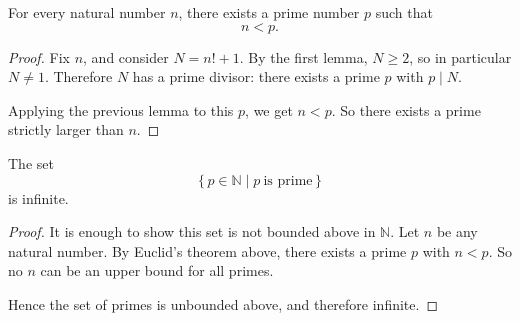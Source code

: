 \begin{theorem}
For every natural number $n$, there exists a prime number $p$ such that
\[
n<p.
\]
\end{theorem}

\begin{proof}
Fix $n$, and consider $N=n!+1$. By the first lemma, $N\ge 2$, so in particular $N\ne 1$. Therefore $N$ has a prime divisor: there exists a prime $p$ with $p\mid N$.

Applying the previous lemma to this $p$, we get $n<p$. So there exists a prime strictly larger than $n$.
\end{proof}

\begin{theorem}
The set
\[
\{\,p\in\mathbb{N}\mid p\ \text{is prime}\,\}
\]
is infinite.
\end{theorem}

\begin{proof}
It is enough to show this set is not bounded above in $\mathbb{N}$. Let $n$ be any natural number. By Euclid's theorem above, there exists a prime $p$ with $n<p$. So no $n$ can be an upper bound for all primes.

Hence the set of primes is unbounded above, and therefore infinite.
\end{proof}
